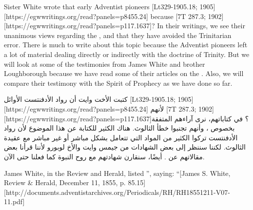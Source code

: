 



Sister White wrote that early Adventist pioneers [Lt329-1905.18; 1905][https://egwwritings.org/read?panels=p8455.24] because [7T 287.3; 1902][https://egwwritings.org/read?panels=p117.1637]? In their writings, we see their unanimous views regarding the , and that they have avoided the Trinitarian error. There is much to write about this topic because the Adventist pioneers left a lot of material dealing directly or indirectly with the doctrine of Trinity. But we will look at some of the testimonies from James White and brother Loughborough because we have read some of their articles on the . Also, we will compare their testimony with the Spirit of Prophecy as we have done so far.


كتبت الأخت وايت أن رواد الأدفنتست الأوائل [Lt329-1905.18; 1905][https://egwwritings.org/read?panels=p8455.24] لأنهم [7T 287.3; 1902][https://egwwritings.org/read?panels=p117.1637]؟ في كتاباتهم، نرى آراءهم المتفقة بخصوص ، وأنهم تجنبوا خطأ الثالوث. هناك الكثير للكتابة عن هذا الموضوع لأن رواد الأدفنتست تركوا الكثير من المواد التي تتعامل بشكل مباشر أو غير مباشر مع عقيدة الثالوث. لكننا سننظر إلى بعض الشهادات من جيمس وايت والأخ لوبورو لأننا قرأنا بعض مقالاتهم عن . أيضًا، سنقارن شهادتهم مع روح النبوة كما فعلنا حتى الآن.


James White, in the Review and Herald, listed ”, saying: “[James S. White, Review \& Herald, December 11, 1855, p. 85.15][http://documents.adventistarchives.org/Periodicals/RH/RH18551211-V07-11.pdf]



